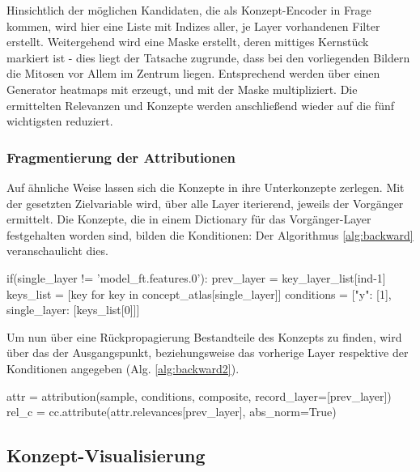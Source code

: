 Hinsichtlich der möglichen Kandidaten, die als Konzept-Encoder in Frage kommen, wird hier eine Liste mit Indizes aller, je Layer vorhandenen Filter erstellt. Weitergehend wird eine Maske erstellt, deren mittiges Kernstück markiert ist - dies liegt der Tatsache zugrunde, dass  bei den vorliegenden Bildern die Mitosen vor Allem im Zentrum liegen. Entsprechend werden über einen Generator heatmaps mit  erzeugt, und mit der Maske multipliziert. Die ermittelten Relevanzen und Konzepte werden anschließend wieder auf die fünf wichtigsten reduziert.

\subsubsection{Fragmentierung der Attributionen}
Auf ähnliche Weise lassen sich die Konzepte in ihre Unterkonzepte zerlegen.
Mit der gesetzten Zielvariable wird, über alle Layer iterierend, jeweils der Vorgänger ermittelt.
Die Konzepte, die in einem Dictionary für das Vorgänger-Layer festgehalten worden sind, bilden die Konditionen: Der Algorithmus \ref{alg:backward} veranschaulicht dies.
\begin{python}[caption={Generierung von Konditionen für Konzepte von Vorgängerlayern (Auszug aus der Methode \lstinline{decompose_attribute_imgs()})},label=alg:backward]
 
if(single_layer != 'model_ft.features.0'):
    prev_layer = key_layer_list[ind-1]
    keys_list = [key for key in concept_atlas[single_layer]]
    conditions = [{"y": [1], single_layer: [keys_list[0]]}]
\end{python}

Um nun über eine Rückpropagierung Bestandteile des Konzepts zu finden, wird über das  der Ausgangspunkt, beziehungsweise das vorherige Layer respektive der Konditionen angegeben (Alg. \ref{alg:backward2}).
\begin{python}[caption={Rückpropagierung von Relevanzen ausgehend vom aktuellen Layer (Auszug aus der Methode \lstinline{decompose_attribute_imgs()})},label=alg:backward2]
attr = attribution(sample, conditions, composite, record_layer=[prev_layer])
rel_c = cc.attribute(attr.relevances[prev_layer], abs_norm=True)
\end{python}

\subsection{Konzept-Visualisierung}


